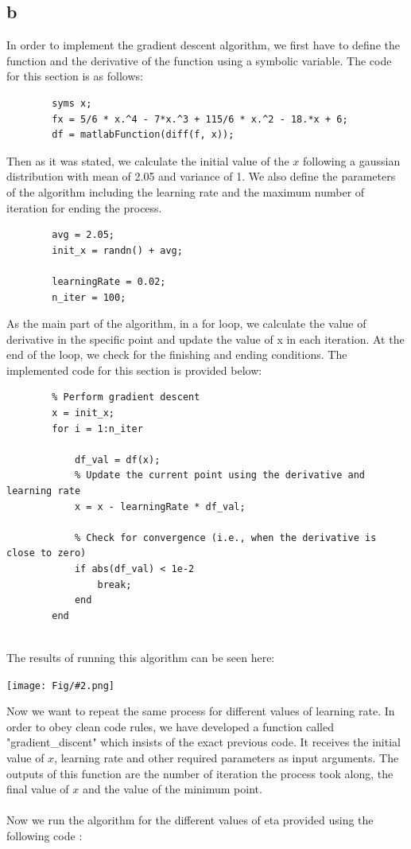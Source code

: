 \documentclass[]{article}
\newcommand{\pict}[2]{\begin{center}
		\texttt{[image: Fig/\#2.png]}
\end{center}}
\begin{document}
	\subsection*{b}
	In order to implement the gradient descent algorithm, we first have to define the function and the derivative of the function using a symbolic variable. The code for this section is as follows:
	\begin{lstlisting}
		syms x;
		fx = 5/6 * x.^4 - 7*x.^3 + 115/6 * x.^2 - 18.*x + 6;
		df = matlabFunction(diff(f, x));
	\end{lstlisting}
	Then as it was stated, we calculate the initial value of the $x$ following a gaussian distribution with mean of 2.05 and variance of 1. We also define the parameters of the algorithm including the learning rate and the maximum number of iteration for ending the process.
	\begin{lstlisting}
		avg = 2.05;
		init_x = randn() + avg;
		
		learningRate = 0.02;
		n_iter = 100;
	\end{lstlisting}
	As the main part of the algorithm, in a for loop, we calculate the value of derivative in the specific point and update the value of x in each iteration. At the end of the loop, we check for the finishing and ending conditions. The implemented code for this section is provided below:
	\begin{lstlisting}
		% Perform gradient descent
		x = init_x;
		for i = 1:n_iter
			
			df_val = df(x);
			% Update the current point using the derivative and learning rate
			x = x - learningRate * df_val;
			
			% Check for convergence (i.e., when the derivative is close to zero)
			if abs(df_val) < 1e-2
				break;
			end
		end
		
	\end{lstlisting}
	The results of running this algorithm can be seen here:
	\pict{0.9}{F6}
	Now we want to repeat the same process for different values of learning rate. In order to obey clean code rules, we have developed a function called "gradient\_discent" which insists of the exact previous code. It receives the initial value of $x$, learning rate and other required parameters as input arguments. The outputs of this function are the number of iteration the process took along, the final value of $x$ and the value of the minimum point.\\\\
	Now we run the algorithm for the different values of eta provided using the following code :
\end{document}
